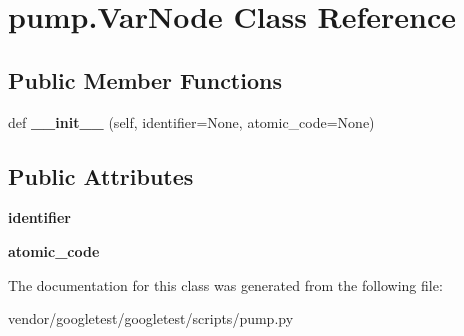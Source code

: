 \hypertarget{classpump_1_1_var_node}{}\section{pump.\+Var\+Node Class Reference}
\label{classpump_1_1_var_node}
\subsection*{Public Member Functions}
\begin{DoxyCompactItemize}
\item 
\mbox{\label{classpump_1_1_var_node_adf79bf21b1db5367792a4ac91f94a756}} 
def {\bfseries \+\_\+\+\_\+init\+\_\+\+\_\+} (self, identifier=None, atomic\+\_\+code=None)
\end{DoxyCompactItemize}
\subsection*{Public Attributes}
\begin{DoxyCompactItemize}
\item 
\mbox{\label{classpump_1_1_var_node_aa2b634e2443646c3754f2d193efa4dc7}} 
{\bfseries identifier}
\item 
\mbox{\label{classpump_1_1_var_node_ad6bef6a8577b994fbe9ccddf3c82d2fc}} 
{\bfseries atomic\+\_\+code}
\end{DoxyCompactItemize}


The documentation for this class was generated from the following file\+:\begin{DoxyCompactItemize}
\item 
vendor/googletest/googletest/scripts/pump.\+py\end{DoxyCompactItemize}
